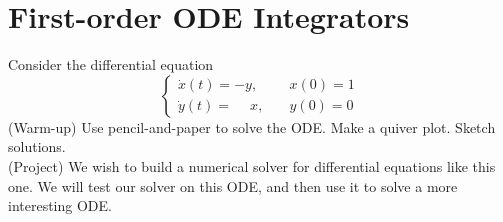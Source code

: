 
\section{First-order ODE Integrators}
Consider the differential equation
\begin{equation}
\label{eq:ode_system}
\begin{cases} \dot{x}(t) = -y, & \quad x(0) = 1\\ \dot{y}(t) = \phantom{-}x, & \quad y(0) = 0 \end{cases}
\end{equation}
(Warm-up) Use pencil-and-paper to solve the ODE. Make a quiver plot. Sketch solutions.\\
(Project) We wish to build a numerical solver for differential equations like this one. We will test our solver on this ODE, and then use it to solve a more interesting ODE.

